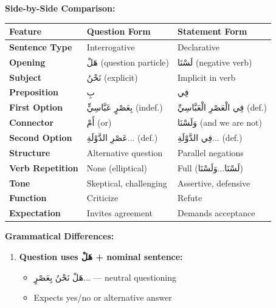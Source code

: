 \documentclass[letterpaper,12pt]{article}
\begin{document}
\begin{tcolorbox}[colback=white,colframe=accentcolor,breakable]
\textbf{Side-by-Side Comparison:}

\begin{center}
\begin{tabular}{|l|p{6cm}|p{6cm}|}
\hline
\textbf{Feature} & \textbf{Question Form} & \textbf{Statement Form} \\
\hline
\textbf{Sentence Type} & Interrogative & Declarative \\
\hline
\textbf{Opening} & \textarabic{هَلْ} (question particle) & \textarabic{لَسْنَا} (negative verb) \\
\hline
\textbf{Subject} & \textarabic{نَحْنُ} (explicit) & Implicit in verb \\
\hline
\textbf{Preposition} & \textarabic{بِ} & \textarabic{فِي} \\
\hline
\textbf{First Option} & \textarabic{بِعَصْرٍ عَبَّاسِيٍّ} (indef.) & \textarabic{فِي الْعَصْرِ الْعَبَّاسِيِّ} (def.) \\
\hline
\textbf{Connector} & \textarabic{أَمْ} (or) & \textarabic{وَلَسْنَا} (and we are not) \\
\hline
\textbf{Second Option} & \textarabic{عَصْرِ الدَّوْلَةِ...} (def.) & \textarabic{فِي الدَّوْلَةِ...} (def.) \\
\hline
\textbf{Structure} & Alternative question & Parallel negations \\
\hline
\textbf{Verb Repetition} & None (elliptical) & Full (\textarabic{لَسْنَا...وَلَسْنَا}) \\
\hline
\textbf{Tone} & Skeptical, challenging & Assertive, defensive \\
\hline
\textbf{Function} & Criticize & Refute \\
\hline
\textbf{Expectation} & Invites agreement & Demands acceptance \\
\hline
\end{tabular}
\end{center}

\vspace{0.5em}
\textbf{Grammatical Differences:}

\begin{enumerate}
\item \textbf{Question uses \textarabic{هَلْ} + nominal sentence:}
\begin{itemize}
\item \textarabic{هَلْ نَحْنُ بِعَصْرٍ...} — neutral questioning
\item Expects yes/no or alternative answer
\end{itemize}


\end{enumerate}
\end{tcolorbox}
\end{document}

